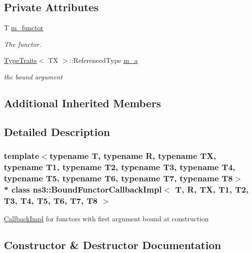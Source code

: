 \subsection*{Private Attributes}
\begin{DoxyCompactItemize}
\item 
T \hyperlink{classns3_1_1BoundFunctorCallbackImpl_ad64916599b5cadd04158453c1e1359b0}{m\+\_\+functor}
\begin{DoxyCompactList}\small\item\em The functor. \end{DoxyCompactList}\item 
\hyperlink{structTypeTraits}{Type\+Traits}$<$ TX $>$\+::Referenced\+Type \hyperlink{classns3_1_1BoundFunctorCallbackImpl_a61861c0e7e19a73e652cb661029852df}{m\+\_\+a}
\begin{DoxyCompactList}\small\item\em the bound argument \end{DoxyCompactList}\end{DoxyCompactItemize}
\subsection*{Additional Inherited Members}


\subsection{Detailed Description}
\subsubsection*{template$<$typename T, typename R, typename TX, typename T1, typename T2, typename T3, typename T4, typename T5, typename T6, typename T7, typename T8$>$\\*
class ns3\+::\+Bound\+Functor\+Callback\+Impl$<$ T, R, T\+X, T1, T2, T3, T4, T5, T6, T7, T8 $>$}

\hyperlink{classns3_1_1CallbackImpl}{Callback\+Impl} for functors with first argument bound at construction 

\subsection{Constructor \& Destructor Documentation}
